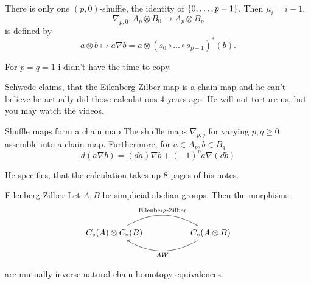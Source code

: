 \documentclass[language=english]{TemplateLecture}
\begin{document}
\begin{example}
    There is only one \((p,0)\)-shuffle, the identity of \(\{0, \dots, p-1\}\). Then \(\mu_i = i-1\).
    \[\nabla_{p,0}\colon A_p \otimes B_0 \to A_p \otimes B_p\]
    is defined by
    \[a\otimes b \mapsto a\nabla b = a \otimes (s_0 \circ \dots \circ s_{p-1})^*(b).\]

    For \(p = q = 1\) i didn't have the time to copy.
\end{example}

Schwede claims, that the Eilenberg-Zilber map is a chain map and he can't believe he actually did those calculations 4 years ago. He will not torture us, but you may watch the videos.

\begin{thm}{Shuffle maps form a chain map}{}
    The shuffle maps \(\nabla_{p,q}\) for varying \(p,q \geq 0\) assemble into a chain map. Furthermore, for \(a \in A_p, b \in B_q\)
    \[d(a\nabla b) = (da) \nabla b + (-1)^p a \nabla (db)\]
\end{thm}

He specifies, that the calculation takes up 8 pages of his notes.


\begin{thm}{Eilenberg-Zilber}{}
    Let \(A,B\) be simplicial abelian groups. Then the morphisms
    \[\begin{tikzcd}
        C_*(A) \otimes C_*(B) \ar[rr, bend left, "\text{Eilenberg-Zilber}"] && C_*(A\otimes B) \ar[ll, bend left, "AW"]
    \end{tikzcd}\]

    are mutually inverse natural chain homotopy equivalences.
\end{thm}
\end{document}
